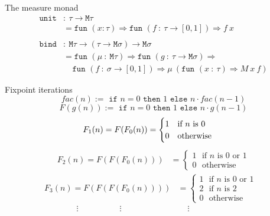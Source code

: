 \documentclass{beamer}
\begin{document}

\begin{frame}{The measure monad}
  \begin{align*}
    \texttt{unit} & :~ \tau\to\texttt{M}\tau\\
                  & = \texttt{fun }(x:\tau)\Rightarrow
                    \texttt{fun }(f~:~\tau\to[0,1])\Rightarrow f~x\\
    \\
    \texttt{bind} & :~\texttt{M}\tau\to(\tau\to\texttt{M}\sigma)\to\texttt{M}\sigma\\
                  & = \texttt{fun }(\mu~:~\texttt{M}\tau)\Rightarrow \texttt{fun }
                    (g~:~\tau\to\texttt{M}\sigma) \Rightarrow\\
                  & ~~~~~\texttt{fun }(f~:~\sigma\to[0,1])\Rightarrow \mu~ (\texttt{fun
                    }(x~:~\tau)\Rightarrow M~x~f)
  \end{align*}
\end{frame}


\begin{frame}{Fixpoint iterations}
  $$\textit{fac}(n) := \texttt{ if } n = 0 \texttt{ then }1\texttt{ else } n\cdot
  \textit{fac}(n-1)$$
  \pause
  $$F(g(n)):=\texttt{ if }n=0\texttt{ then }1\texttt{ else }n\cdot g(n-1)$$
  \pause
  \begin{align*}
    \hspace{0.6em}
    F_1(n) = F(F_0(n)) & = \begin{cases}
      1~~~\text{if }n\text{ is 0}\\
      0~~~\text{otherwise}
    \end{cases}
  \end{align*}
  \pause
  \vspace{-1em}
  \begin{align*}
    F_2(n) = F(F(F_0(n))) & = \begin{cases}
      1~~~\text{if }n\text{ is 0 or 1}\\
      0~~~\text{otherwise}
    \end{cases}
  \end{align*}
  \pause
  \vspace{-1em}
  \begin{align*}
    F_3(n) = F(F(F(F_0(n)))) & = \begin{cases}
      1~~~\text{if }n\text{ is 0 or 1}\\
      2~~~\text{if }n\text{ is 2}\\
      0~~~\text{otherwise}\hspace{2em}
    \end{cases}
  \end{align*}
  \pause
  \vspace{-1em}
  \begin{align*}
    \vdots \hspace{5em} \vdots \hspace{5em} \hspace{3em}\vdots\hspace{5em}
  \end{align*}
\end{frame}
\end{document}
